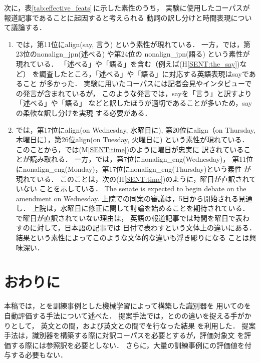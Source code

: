 \documentclass[japanese]{jnlp_1.4}
\newcommand{\align}{}
\newcommand{\FLU}{}
\newcommand{\HUM}{}
\newcommand{\MT}{}
\newcommand{\MTS}{}
\newenvironment{SENT2}{}{}
\begin{document}
次に，表\ref{tab:effective_feats}\,に示した素性のうち，
実験に使用したコーパスが報道記事であることに起因すると考えられる
動詞の訳し分けと時間表現について議論する．
\begin{enumerate}
\item
{\MTS}では，第11位にalign(say, 言う) という素性が現れている．
一方，{\HUM}では，第23位のnonalign\_jpn(述べる) や第24位の
nonalign\_jpn(語る) という素性が現れている．
「述べる」や「語る」を含む{\HUM}（例えば(H\ref{SENT:the_say})など）
を調査したところ，「述べる」や「語る」に対応する英語表現はsayであること
が多かった．
実験に用いたコーパスには記者会見やインタビューでの発言が含まれているが，
このような発言では，sayを「言う」と訳すより「述べる」や「語る」
などと訳したほうが適切であることが多いため，sayの柔軟な訳し分けを実現
する必要がある．

\item
{\MTS}では，第17位にalign(on Wednesday,  水曜日に), 
第20位にalign（on Thursday, 木曜日に），第26位align(on Tuesday, 火曜日に) 
という素性が現れている．
このことから，{\MTS}では(M\ref{SENT:time})のように曜日が忠実に
訳されていることが読み取れる．
一方，{\HUM}では，第7位にnonalign\_eng(Wednesday)，
第11位にnonalign\_eng(Monday)，第17位にnonalign\_eng(Thursday)という素性
が現れている．
このことは，次の{\HUM}(H\ref{SENT:time})のように，曜日が直訳されていない
ことを示している．
\begin{SENT2}
\sentE The senate is expected to begin debate on the amendment on 
Wednesday. 
\sentH 上院での同案の審議は，5日から開始される見通し．
\sentM 上院は，水曜日に修正に関して討論を始めることを期待されている．
\label{SENT:time}
\end{SENT2}
{\HUM}で曜日が直訳されていない理由は，
英語の報道記事では時間を曜日で表わすのに対して，日本語の記事では
日付で表わすという文体上の違いにある．
{\align}結果という素性によってこのような文体的な違いも浮き彫りになる
ことは興味深い．
\end{enumerate}



\section{おわりに}

本稿では，{\HUM}と{\MT}を訓練事例とした機械学習によって構築した識別器を
用いて{\MT}の{\FLU}を自動評価する手法について述べた．
提案手法では，{\HUM}と{\MT}の{\FLU}の違いを捉える手がかりとして，
英文と{\HUM}の間，および英文と{\MT}の間で{\align}を行なった結果
を利用した．
提案手法は，識別器を構築する際に対訳コーパスを必要とするが，評価対象文
を評価する際には参照訳を必要としない．
さらに，大量の訓練事例に{\FLU}の評価値を付与する必要もない．
\end{document}
